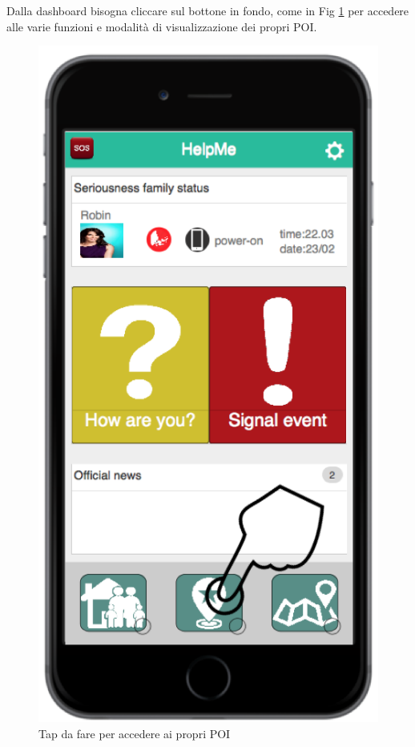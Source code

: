 \begin{itemize}
Dalla dashboard bisogna cliccare sul bottone in fondo, come in Fig \ref{fig:buttonpoi} per accedere alle varie funzioni e modalità di visualizzazione dei propri POI.
\begin{figure}[H]
	\centering
	\includegraphics[scale=1]{interfaccia/buttonpoi.png}
	\caption{Tap da fare per accedere ai propri POI }
	\label{fig:buttonpoi}
\end{figure}
\begin{figure}[H]

\end{figure}
\end{itemize}

